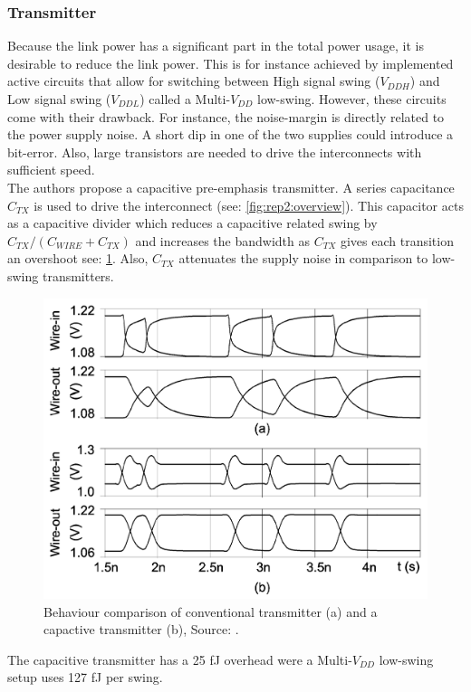 \subsubsection{Transmitter}
Because the link power has a significant part in the total power usage, it is desirable to reduce the link power. 
This is for instance achieved by implemented active circuits that allow for switching between High signal swing ($V_{DDH}$) and Low signal swing ($V_{DDL}$) called a Multi-$V_{DD}$ low-swing. 
However, these circuits come with their drawback. 
For instance, the noise-margin is directly related to the power supply noise. 
A short dip in one of the two supplies could introduce a bit-error.
Also, large transistors are needed to drive the interconnects with sufficient speed.
\\
The authors propose a capacitive pre-emphasis transmitter. 
A series capacitance $C_{TX}$ is used to drive the interconnect (see: \cref{fig:rep2:overview}). 
This capacitor acts as a capacitive divider which reduces a capacitive related swing by $C_{TX} / ( C_{WIRE} + C_{TX})$ and increases the bandwidth as $C_{TX}$ gives each transition an overshoot see: \cref{fig:rep2:capovershoot}.
Also, $C_{TX}$ attenuates the supply noise in comparison to low-swing transmitters.

\begin{figure}[]
	\centering
	\includegraphics[width=0.8\linewidth]{Figures/Rep2TransmitterCap.png}
	\caption{Behaviour comparison of conventional transmitter (a) and a capactive transmitter (b), Source: \cite{schinkel2009low}.} 
    \label{fig:rep2:capovershoot}
\end{figure}

The capacitive transmitter has a 25 fJ overhead were a Multi-$V_{DD}$ low-swing setup uses 127 fJ per swing.



